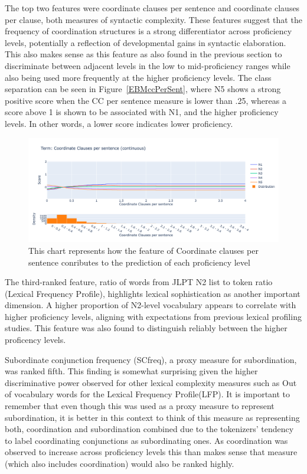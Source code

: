 The top two features were coordinate clauses per sentence and coordinate clauses per clause, both measures of
syntactic complexity. These features suggest that the frequency of coordination structures is a strong
differentiator across proficiency levels, potentially a reflection of developmental gains in syntactic elaboration. This
also makes sense as this feature as also found in the previous section to discriminate between adjacent levels in
the low to mid-proficiency ranges while also being used more frequently at the higher proficiency levels. The class
separation can be seen in Figure~\ref{EBMccPerSent}, where N5 shows a strong positive score when the CC per sentence
measure is lower than .25, whereas a score above 1 is shown to be associated with N1, and the higher proficiency
levels. In other words, a lower score indicates lower
proficiency.

\begin{figure}[h!]
    \centering
    \includegraphics[scale=.04]{img/EBM/EBMccPerSent}
    \caption[Contribution of Coordinate Clauses per Sentence]{This chart represents how the feature of Coordinate clauses per sentence conributes to the prediction of each proficiency level}
    \label{fig:EBMccPerSent}
\end{figure}


The third-ranked feature, ratio of words from JLPT N2 list to token ratio (Lexical Frequency Profile), highlights
lexical sophistication as another important dimension. A higher proportion of N2-level vocabulary appears to
correlate with higher proficiency levels, aligning with expectations from previous lexical profiling studies\citep{Laufer1995}. This feature was also found to distinguish reliably between the higher proficency levels.

Subordinate conjunction frequency (SCfreq), a proxy measure for subordination, was ranked fifth. This finding is
somewhat surprising given the higher discriminative power observed for other lexical complexity measures such as Out
of vocabulary words for the Lexical Frequency Profile(LFP). It is important to remember that even though this was
used as a proxy measure to represent subordination, it is better in this context to think of this measure as
representing both, coordination and subordination combined due to the tokenizers' tendency to label coordinating
conjunctions
as subordinating ones. As coordination was observed to increase across proficiency levels this than makes sense that
measure (which also includes coordination) would also be ranked highly.

